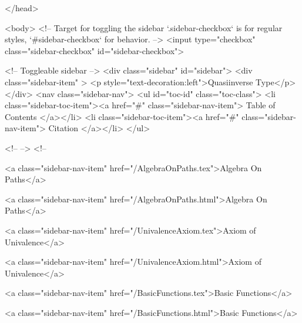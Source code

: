   
</head>




  <body>
    <!-- Target for toggling the sidebar `.sidebar-checkbox` is for regular
     styles, `#sidebar-checkbox` for behavior. -->
<input type="checkbox" class="sidebar-checkbox" id="sidebar-checkbox">

<!-- Toggleable sidebar -->
<div class="sidebar" id="sidebar">
  <div class="sidebar-item" >
    <p style="text-decoration:left">Quasiinverse Type</p>
  </div>
  <nav class="sidebar-nav">
    <ul id="toc-id" class="toc-class">
  <li class="sidebar-toc-item"><a href="#" class="sidebar-nav-item"> Table of Contents </a></li>
  <li class="sidebar-toc-item"><a href="#" class="sidebar-nav-item"> Citation </a></li>
</ul>


    <!--  -->
    <!-- 
      
    
      
    
      
    
      
        
      
    
      
        
          <a class="sidebar-nav-item" href="/AlgebraOnPaths.tex">Algebra On Paths</a>
        
      
    
      
        
          <a class="sidebar-nav-item" href="/AlgebraOnPaths.html">Algebra On Paths</a>
        
      
    
      
        
          <a class="sidebar-nav-item" href="/UnivalenceAxiom.tex">Axiom of Univalence</a>
        
      
    
      
        
          <a class="sidebar-nav-item" href="/UnivalenceAxiom.html">Axiom of Univalence</a>
        
      
    
      
        
          <a class="sidebar-nav-item" href="/BasicFunctions.tex">Basic Functions</a>
        
      
    
      
        
          <a class="sidebar-nav-item" href="/BasicFunctions.html">Basic Functions</a>
        
      
    
      
        
